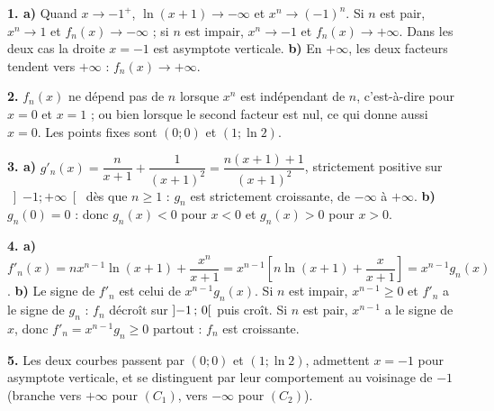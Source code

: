 \begin{corrige}
\textbf{1. a)} Quand $x \to -1^{+}$, $\ln(x+1) \to -\infty$ et
$x^{n} \to (-1)^{n}$. Si $n$ est pair, $x^{n} \to 1$ et
$f_{n}(x) \to -\infty$ ; si $n$ est impair, $x^{n} \to -1$ et
$f_{n}(x) \to +\infty$. Dans les deux cas la droite $x = -1$ est asymptote
verticale. \textbf{b)} En $+\infty$, les deux facteurs tendent vers $+\infty$ :
$f_{n}(x) \to +\infty$.

\textbf{2.} $f_{n}(x)$ ne dépend pas de $n$ lorsque $x^{n}$ est indépendant de
$n$, c'est-à-dire pour $x = 0$ et $x = 1$ ; ou bien lorsque le second facteur
est nul, ce qui donne aussi $x = 0$. Les points fixes sont $(0;0)$ et
$(1;\ln 2)$.

\textbf{3. a)} $g'_{n}(x) = \dfrac{n}{x+1} + \dfrac{1}{(x+1)^{2}}
= \dfrac{n(x+1)+1}{(x+1)^{2}}$, strictement positive sur
$\left]-1;+\infty\right[$ dès que $n \geq 1$ : $g_{n}$ est strictement
croissante, de $-\infty$ à $+\infty$. \textbf{b)} $g_{n}(0) = 0$ : donc
$g_{n}(x) < 0$ pour $x<0$ et $g_{n}(x)>0$ pour $x>0$.

\textbf{4. a)} $f'_{n}(x) = nx^{n-1}\ln(x+1) + \dfrac{x^{n}}{x+1}
= x^{n-1}\left[n\ln(x+1) + \dfrac{x}{x+1}\right] = x^{n-1}g_{n}(x)$.
\textbf{b)} Le signe de $f'_{n}$ est celui de $x^{n-1}g_{n}(x)$. Si $n$ est
impair, $x^{n-1} \geq 0$ et $f'_{n}$ a le signe de $g_{n}$ : $f_{n}$ décroît
sur $\left]-1\,;\,0\right[$ puis croît. Si $n$ est pair, $x^{n-1}$ a le signe de
$x$, donc $f'_{n} = x^{n-1}g_{n} \geq 0$ partout : $f_{n}$ est croissante.

\textbf{5.} Les deux courbes passent par $(0;0)$ et $(1;\ln2)$, admettent
$x=-1$ pour asymptote verticale, et se distinguent par leur comportement au
voisinage de $-1$ (branche vers $+\infty$ pour $(C_{1})$, vers $-\infty$ pour
$(C_{2})$).
\end{corrige}

